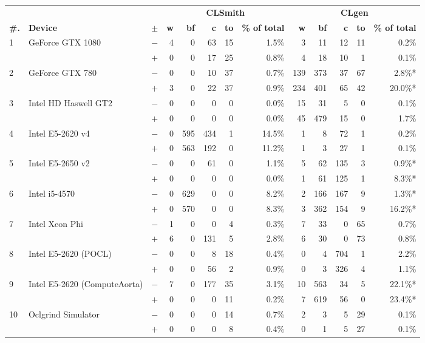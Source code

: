   \begin{tabular}{lll | rrrrr | rrrrr }
  \toprule
  & & & \multicolumn{5}{c|}{\textbf{CLSmith}} & \multicolumn{5}{c}{\textbf{CLgen}} \\
  \textbf{\#.} & \textbf{Device} & $\pm$ &
  \textbf{w} & \textbf{bf} & \textbf{c} & \textbf{to} & \textbf{\% of total} &
  \textbf{w} & \textbf{bf} & \textbf{c} & \textbf{to} & \textbf{\% of total} \\
  \midrule
  \multirow{ 2}{*}{1} & \multirow{ 2}{*}{GeForce GTX 1080} & $-$ & 4 & 0 & 63 & 15 & 1.5\%       & 3 & 11 & 12 & 11 & 0.2\% \\& & $+$ & 0 & 0 & 17 & 25 & 0.8\% & 4 & 18 & 10 & 1 & 0.1\% \\
\hline
\multirow{ 2}{*}{2} & \multirow{ 2}{*}{GeForce GTX 780} & $-$ & 0 & 0 & 10 & 37 & 0.7\%       & 139 & 373 & 37 & 67 & 2.8\%* \\& & $+$ & 3 & 0 & 22 & 37 & 0.9\% & 234 & 401 & 65 & 42 & 20.0\%* \\
\hline
\multirow{ 2}{*}{3} & \multirow{ 2}{*}{Intel HD Haswell GT2} & $-$ & 0 & 0 & 0 & 0 & 0.0\%       & 15 & 31 & 5 & 0 & 0.1\% \\& & $+$ & 0 & 0 & 0 & 0 & 0.0\% & 45 & 479 & 15 & 0 & 1.7\% \\
\hline
\multirow{ 2}{*}{4} & \multirow{ 2}{*}{Intel E5-2620 v4} & $-$ & 0 & 595 & 434 & 1 & 14.5\%       & 1 & 8 & 72 & 1 & 0.2\% \\& & $+$ & 0 & 563 & 192 & 0 & 11.2\% & 1 & 3 & 27 & 1 & 0.1\% \\
\hline
\multirow{ 2}{*}{5} & \multirow{ 2}{*}{Intel E5-2650 v2} & $-$ & 0 & 0 & 61 & 0 & 1.1\%       & 5 & 62 & 135 & 3 & 0.9\%* \\& & $+$ & 0 & 0 & 0 & 0 & 0.0\% & 1 & 61 & 125 & 1 & 8.3\%* \\
\hline
\multirow{ 2}{*}{6} & \multirow{ 2}{*}{Intel i5-4570} & $-$ & 0 & 629 & 0 & 0 & 8.2\%       & 2 & 166 & 167 & 9 & 1.3\%* \\& & $+$ & 0 & 570 & 0 & 0 & 8.3\% & 3 & 362 & 154 & 9 & 16.2\%* \\
\hline
\multirow{ 2}{*}{7} & \multirow{ 2}{*}{Intel Xeon Phi} & $-$ & 1 & 0 & 0 & 4 & 0.3\%       & 7 & 33 & 0 & 65 & 0.7\% \\& & $+$ & 6 & 0 & 131 & 5 & 2.8\% & 6 & 30 & 0 & 73 & 0.8\% \\
\hline
\multirow{ 2}{*}{8} & \multirow{ 2}{*}{Intel E5-2620 (POCL)} & $-$ & 0 & 0 & 8 & 18 & 0.4\%       & 0 & 4 & 704 & 1 & 2.2\% \\& & $+$ & 0 & 0 & 56 & 2 & 0.9\% & 0 & 3 & 326 & 4 & 1.1\% \\
\hline
\multirow{ 2}{*}{9} & \multirow{ 2}{*}{Intel E5-2620 (ComputeAorta)} & $-$ & 7 & 0 & 177 & 35 & 3.1\%       & 10 & 563 & 34 & 5 & 22.1\%* \\& & $+$ & 0 & 0 & 0 & 11 & 0.2\% & 7 & 619 & 56 & 0 & 23.4\%* \\
\hline
\multirow{ 2}{*}{10} & \multirow{ 2}{*}{Oclgrind Simulator} & $-$ & 0 & 0 & 0 & 14 & 0.7\%       & 2 & 3 & 5 & 29 & 0.1\% \\& & $+$ & 0 & 0 & 0 & 8 & 0.4\% & 0 & 1 & 5 & 27 & 0.1\% \\
  \bottomrule
\end{tabular}

